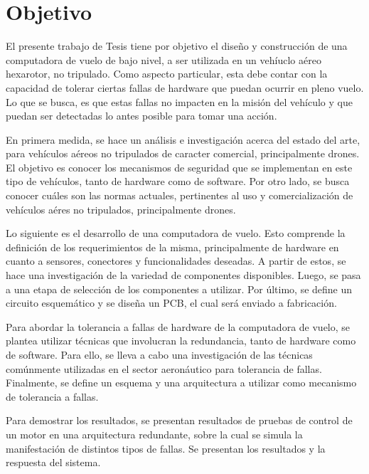 \section{Objetivo}

El presente trabajo de Tesis tiene por objetivo el diseño y construcción de una computadora de vuelo de bajo nivel, a ser utilizada en un vehíuclo aéreo hexarotor, no tripulado. Como aspecto particular, esta debe contar con la capacidad de tolerar ciertas fallas de hardware que puedan ocurrir en pleno vuelo. Lo que se busca, es que estas fallas no impacten en la misión del vehículo y que puedan ser detectadas lo antes posible para tomar una acción.

En primera medida, se hace un análisis e investigación acerca del estado del arte, para vehículos aéreos no tripulados de caracter comercial, principalmente drones. El objetivo es conocer los mecanismos de seguridad que se implementan en este tipo de vehículos, tanto de hardware como de software. Por otro lado, se busca conocer cuáles son las normas actuales, pertinentes al uso y comercialización de vehículos aéres no tripulados, principalmente drones.

Lo siguiente es el desarrollo de una computadora de vuelo. Esto comprende la definición de los requerimientos de la misma, principalmente de hardware en cuanto a sensores, conectores y funcionalidades deseadas. A partir de estos, se hace una investigación de la variedad de componentes disponibles. Luego, se pasa a una etapa de selección de los componentes a utilizar. Por último, se define un circuito esquemático y se diseña un PCB, el cual será enviado a fabricación.

Para abordar la tolerancia a fallas de hardware de la computadora de vuelo, se plantea utilizar técnicas que involucran la redundancia, tanto de hardware como de software. Para ello, se lleva a cabo una investigación de las técnicas comúnmente utilizadas en el sector aeronáutico para tolerancia de fallas. Finalmente, se define un esquema y una arquitectura a utilizar como mecanismo de tolerancia a fallas.

Para demostrar los resultados, se presentan resultados de pruebas de control de un motor en una arquitectura redundante, sobre la cual se simula la manifestación de distintos tipos de fallas. Se presentan los resultados y la respuesta del sistema.